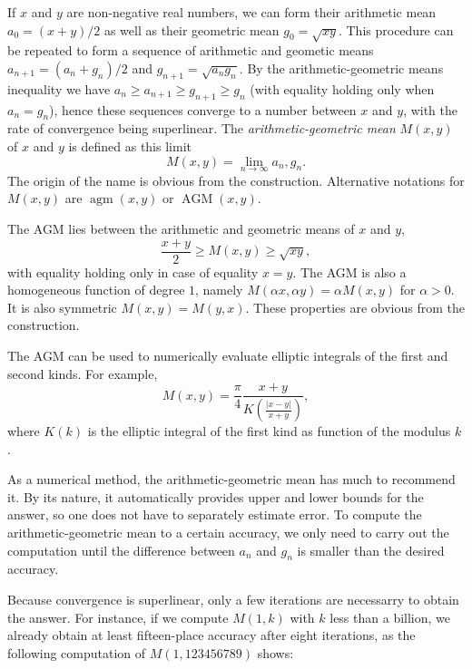 \documentclass[12pt]{article}
\def\oo{\infty}
\def\agm{\operatorname{agm}}
\def\AGM{\operatorname{AGM}}
\begin{document}
If $x$ and $y$ are non-negative real numbers, we can form their arithmetic
mean $a_0 = (x+y)/2$ as well as their geometric mean $g_0 = \sqrt{xy}$.
This procedure can be repeated to form a sequence of arithmetic and
geometic means $a_{n+1} = (a_n+g_n)/2$ and $g_{n+1} = \sqrt{a_n g_n}$.
By the arithmetic-geometric means inequality we have $a_n \ge a_{n+1} \ge g_{n+1} \ge g_n$ (with equality holding only when $a_n=g_n$),
hence these sequences converge to a number between $x$ and $y$,
with the rate of convergence being superlinear.
The \emph{arithmetic-geometric mean} $M(x,y)$ of $x$ and $y$
is defined as this limit
\begin{equation*}
  M(x,y) = \lim_{n\to\oo} a_n, g_n.
\end{equation*}
The origin of the name is obvious from the construction. Alternative notations
for $M(x,y)$ are $\agm(x,y)$ or $\AGM(x,y)$.

The AGM lies between the arithmetic and geometric
means of $x$ and $y$,
\begin{equation*}
  \frac{x+y}{2} \ge M(x,y) \ge \sqrt{xy},
\end{equation*}
with equality holding only in case of equality $x=y$. The AGM is also a
homogeneous function of degree $1$, namely $M(\alpha x, \alpha y)
= \alpha M(x,y)$ for $\alpha > 0$. It is also symmetric $M(x,y) = M(y,x)$.
These properties are obvious from the construction.

The AGM can be used to numerically evaluate elliptic integrals of the
first and second kinds. For example,
\begin{equation}
  M(x,y) = \frac{\pi}{4} \frac{x+y}{K\left(\frac{|x-y|}{x+y}\right)},
\end{equation}
where $K(k)$ is the elliptic integral of the first kind as function of
the modulus $k$.

As a numerical method, the arithmetic-geometric mean has much to recommend it.
By its nature, it automatically provides upper and lower bounds for the
answer, so one does not have to separately estimate error.  To compute
the arithmetic-geometric mean to a certain accuracy, we only need to carry
out the computation until the difference between $a_n$ and $g_n$ is smaller
than the desired accuracy.

Because convergence is superlinear, only a few iterations are necessarry to
obtain the answer.  For instance, if we compute $M(1,k)$ with $k$ less than 
a billion, we already obtain at least fifteen-place accuracy after eight 
iterations, as the following computation of $M(1,123456789)$ shows:
\end{document}
